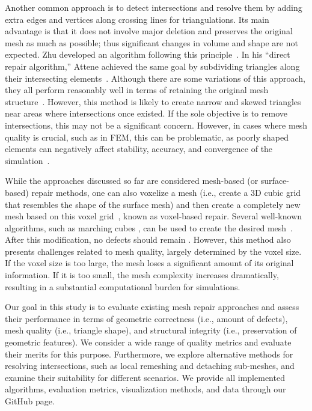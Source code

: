 Another common approach is to detect intersections and resolve them by adding extra edges and vertices along crossing lines for triangulations. Its main advantage is that it does not involve major deletion and preserves the original mesh as much as possible; thus significant changes in volume and shape are not expected. Zhu developed an algorithm following this principle~\cite{Zhu2019robustalgo}. In his “direct repair algorithm,” Attene achieved the same goal by subdividing triangles along their intersecting elements~\cite{attene2014directrepair}. Although there are some variations of this approach, they all perform reasonably well in terms of retaining the original mesh structure~\cite{cherchi2020floating, charton2021topology}. However, this method is likely to create narrow and skewed triangles near areas where intersections once existed. If the sole objective is to remove intersections, this may not be a significant concern. However, in cases where mesh quality is crucial, such as in FEM, this can be problematic, as poorly shaped elements can negatively affect stability, accuracy, and convergence of the simulation~\cite{nemade2020meshquality}.

While the approaches discussed so far are considered mesh-based (or surface-based) repair methods, one can also voxelize a mesh (i.e., create a 3D cubic grid that resembles the shape of the surface mesh) and then create a completely new mesh based on this voxel grid~\cite{ju2009geometric_errors, sfikas2022FoR}, known as voxel-based repair. Several well-known algorithms, such as marching cubes \cite{Lorensen1987marchingcubes}, can be used to create the desired mesh~\cite{ju2009geometric_errors, sfikas2022FoR}. After this modification, no defects should remain \cite{sfikas2022FoR}. However, this method also presents challenges related to mesh quality, largely determined by the voxel size. If the voxel size is too large, the mesh loses a significant amount of its original information. If it is too small, the mesh complexity increases dramatically, resulting in a substantial computational burden for simulations.

Our goal in this study is to evaluate existing mesh repair approaches and assess their performance in terms of geometric correctness (i.e., amount of defects), mesh quality (i.e., triangle shape), and structural integrity (i.e., preservation of geometric features). 
We consider a wide range of quality metrics and evaluate their merits for this purpose. Furthermore, we explore alternative methods for resolving intersections, such as local remeshing and detaching sub-meshes, and examine their suitability for different scenarios. We provide all implemented algorithms, evaluation metrics, visualization methods, and data through our GitHub page.

